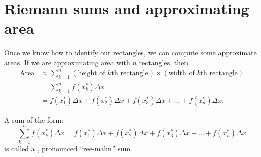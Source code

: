\documentclass{ximera}
\begin{document}
\section{Riemann sums and approximating area}

Once we know how to identify our rectangles, we can compute some
approximate areas. If we are approximating area with $n$ rectangles, then 
\begin{align*}
  \text{Area} &\approx \sum_{k=1}^n (\text{height of $k$th rectangle})\times(\text{width of $k$th rectangle}) \\
  &=\sum_{k=1}^n  f(x_k^*)\Delta x \\
  &=  f(x_1^*)\Delta x +  f(x_2^*)\Delta x +   f(x_3^*)\Delta x + \dots +   f(x_n^*)\Delta x. 
\end{align*}


\begin{definition}
  A sum of the form:
  \[
  \sum_{k=1}^n  f(x_k^*)\Delta x  = f(x_1^*)\Delta x +  f(x_2^*)\Delta x +   f(x_3^*)\Delta x + \dots +   f(x_n^*)\Delta x
  \]
  is called a , pronounced ``ree-mahn'' sum. 
\end{definition}
\end{document}
